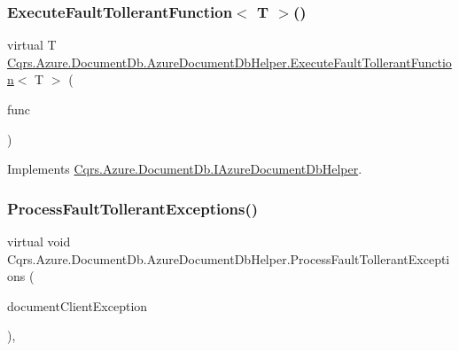 \subsubsection{\texorpdfstring{Execute\+Fault\+Tollerant\+Function$<$ T $>$()}{ExecuteFaultTollerantFunction< T >()}}
{\footnotesize\ttfamily virtual T \hyperlink{classCqrs_1_1Azure_1_1DocumentDb_1_1AzureDocumentDbHelper_a334337444ff416c9f4ce48ec61e60a83}{Cqrs.\+Azure.\+Document\+Db.\+Azure\+Document\+Db\+Helper.\+Execute\+Fault\+Tollerant\+Function}$<$ T $>$ (\begin{DoxyParamCaption}\item[{Func$<$ T $>$}]{func }\end{DoxyParamCaption})\hspace{0.3cm}{\ttfamily [virtual]}}



Implements \hyperlink{interfaceCqrs_1_1Azure_1_1DocumentDb_1_1IAzureDocumentDbHelper_a9693547c39af965e6eeeccc65cdd7bea}{Cqrs.\+Azure.\+Document\+Db.\+I\+Azure\+Document\+Db\+Helper}.

\mbox{\label{classCqrs_1_1Azure_1_1DocumentDb_1_1AzureDocumentDbHelper_a90b2dc3510f45a7cd5e6ed467a6f6d5e}} 
\subsubsection{\texorpdfstring{Process\+Fault\+Tollerant\+Exceptions()}{ProcessFaultTollerantExceptions()}}
{\footnotesize\ttfamily virtual void Cqrs.\+Azure.\+Document\+Db.\+Azure\+Document\+Db\+Helper.\+Process\+Fault\+Tollerant\+Exceptions (\begin{DoxyParamCaption}\item[{Document\+Client\+Exception}]{document\+Client\+Exception }\end{DoxyParamCaption})\hspace{0.3cm}{\ttfamily [protected]}, {\ttfamily [virtual]}}



